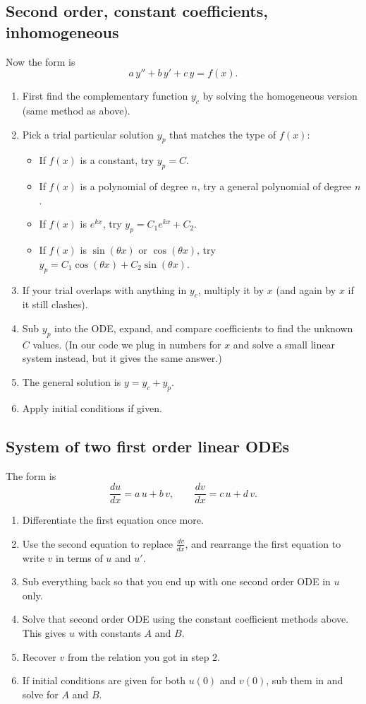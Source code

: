 \documentclass{article}
\begin{document}
\subsection{Second order, constant coefficients, inhomogeneous}
Now the form is
\[
a\,y'' + b\,y' + c\,y = f(x).
\]
\begin{enumerate}
    \item First find the complementary function $y_c$ by solving the homogeneous version (same method as above).
    \item Pick a trial particular solution $y_p$ that matches the type of $f(x)$:
    \begin{itemize}
        \item If $f(x)$ is a constant, try $y_p = C$.
        \item If $f(x)$ is a polynomial of degree $n$, try a general polynomial of degree $n$.
        \item If $f(x)$ is $e^{kx}$, try $y_p = C_1 e^{kx} + C_2$.
        \item If $f(x)$ is $\sin(\theta x)$ or $\cos(\theta x)$, try $y_p = C_1 \cos(\theta x) + C_2 \sin(\theta x)$.
    \end{itemize}
    \item If your trial overlaps with anything in $y_c$, multiply it by $x$ (and again by $x$ if it still clashes).
    \item Sub $y_p$ into the ODE, expand, and compare coefficients to find the unknown $C$ values. (In our code we plug in numbers for $x$ and solve a small linear system instead, but it gives the same answer.)
    \item The general solution is $y = y_c + y_p$.
    \item Apply initial conditions if given.
\end{enumerate}

\subsection{System of two first order linear ODEs}
The form is
\[
\frac{du}{dx} = a\,u + b\,v, \qquad \frac{dv}{dx} = c\,u + d\,v.
\]
\begin{enumerate}
    \item Differentiate the first equation once more.
    \item Use the second equation to replace $\frac{dv}{dx}$, and rearrange the first equation to write $v$ in terms of $u$ and $u'$.
    \item Sub everything back so that you end up with one second order ODE in $u$ only.
    \item Solve that second order ODE using the constant coefficient methods above. This gives $u$ with constants $A$ and $B$.
    \item Recover $v$ from the relation you got in step 2.
    \item If initial conditions are given for both $u(0)$ and $v(0)$, sub them in and solve for $A$ and $B$.
\end{enumerate}
\end{document}
